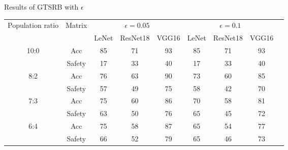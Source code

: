 \documentclass[symmetry,article,submit,moreauthors,pdftex]{Definitions/mdpi}
\begin{document}
\begin{specialtable}[H]
    \centering
    \caption{Results of GTSRB with \begin{math}\epsilon\end{math}}
    \label{gtsrb-results}
    {\small
    \begin{tabular}{|c|c|c|c|c|c|c|c|c|}
    \hline
    \multirow{2}{*}{Population ratio} & \multirow{2}{*}{Matrix} & \multicolumn{3}{c|}{\begin{math}\epsilon=0.05\end{math}}  & \multicolumn{3}{c|}{\begin{math}\epsilon=0.1\end{math}}       \\ \cline{3-8}
                                 &                           & LeNet               & ResNet18              & VGG16       & LeNet              & ResNet18              & VGG16              \\ \hline 
    \multirow{2}{*}{10:0}        & Acc                       & 85                  & 71                    & 93          & 85                 & 71                    & 93                 \\ \cline{2-8} 
                                 & Safety                    & 17                  & 33                    & 40          & 17                 & 33                    & 40                 \\ \hline 
    \multirow{2}{*}{8:2}         & Acc                       & 76                  & 63                    & 90          & 73                 & 60                    & 85                 \\ \cline{2-8} 
                                 & Safety                    & 57                  & 49                    & 75          & 58                 & 42                    & 70                 \\ \hline 
    \multirow{2}{*}{7:3}         & Acc                       & 75                  & 60                    & 86          & 70                 & 58                    & 81                 \\ \cline{2-8} 
                                 & Safety                    & 63                  & 50                    & 76          & 65                 & 45                    & 72                 \\ \hline 
    \multirow{2}{*}{6:4}         & Acc                       & 75                  & 58                    & 87          & 65                 & 54                    & 77                 \\ \cline{2-8} 
                                 & Safety                    & 66                  & 52                    & 79          & 65                 & 46                    & 73                 \\ \hline 
    \end{tabular}
    }
\end{specialtable}
\end{document}
